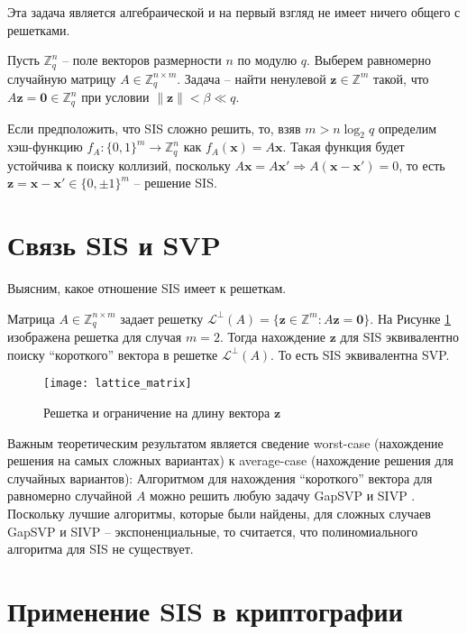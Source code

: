 Эта задача является алгебраической и на первый взгляд не имеет ничего общего с решетками.

Пусть $\mathds{Z}^n_q$ -- поле векторов размерности $n$ по модулю $q$.
Выберем равномерно случайную матрицу $A \in \mathds{Z}^{n \times m}_q$. Задача -- найти ненулевой $\boldsymbol{z} \in \mathds{Z}^m$ такой, что $A \boldsymbol{z} = \boldsymbol{0} \in \mathds{Z}^n_q$ при условии $\|\boldsymbol{z}\| < \beta \ll q$. 

Если предположить, что SIS сложно решить, то, взяв $m > n \log_2 q$ определим хэш-функцию $f_A: \{0,1\}^m \rightarrow \mathds{Z}^n_q$ как $f_A(\boldsymbol{x}) = A\boldsymbol{x}$. Такая функция будет устойчива к поиску коллизий, поскольку $A\boldsymbol{x} = A \boldsymbol{x'} \Rightarrow A(\boldsymbol{x} - \boldsymbol{x'}) = 0$, то есть $\boldsymbol{z} = \boldsymbol{x} - \boldsymbol{x'} \in \{0, \pm 1\}^m$ -- решение SIS.

\section{Связь SIS и SVP}

Выясним, какое отношение SIS имеет к решеткам.

Матрица $A \in \mathds{Z}^{n \times m}_q$ задает решетку $\mathcal{L^{\perp}} (A) = \{\boldsymbol{z} \in \mathds{Z}^m : A\boldsymbol{z} = \boldsymbol{0}\}$. На Рисунке \ref{fig:lattice_matrix} изображена решетка для случая $m = 2$. Тогда нахождение $\boldsymbol{z}$ для SIS эквивалентно поиску ``короткого'' вектора в решетке $\mathcal{L^{\perp}}(A)$. То есть SIS эквивалентна SVP.

\begin{figure}[ht]
	\centering
	\texttt{[image: lattice\_matrix]}
	\caption{Решетка и ограничение на длину вектора $\boldsymbol{z}$}
	\label{fig:lattice_matrix}
\end{figure}

Важным теоретическим результатом является сведение worst-case (нахождение решения на самых сложных вариантах) к average-case (нахождение решения для случайных вариантов):
Алгоритмом для нахождения ``короткого'' вектора для равномерно случайной $A$ можно решить любую задачу GapSVP и SIVP \cite{Ajtai96}. Поскольку лучшие алгоритмы, которые были найдены, для сложных случаев GapSVP и SIVP -- экспоненциальные, то считается, что полиномиального алгоритма для SIS не существует.

\section{Применение SIS в криптографии}

